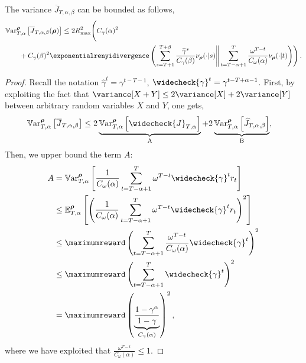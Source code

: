 \begin{lemma}
\label{lem:variance_bound}
The variance $\overline{J}_{T,\alpha,\beta}$ can be bounded as follows,
\begin{align*}
    &\mathbb{V}\mathrm{ar}^{\boldsymbol\rho}_{T,\alpha}\left[\overline{J}_{T,\alpha,\beta}(\boldsymbol\rho)\right]
    \leq
    2 R_{\max}^{2} \Bigg(C_\gamma(\alpha)^2 \\
    &\qquad + C_\gamma(\beta)^2 \exponentialrenyidivergence \left(  \sum_{s=T+1}^{T+\beta} \frac{\widehat{\gamma}^s}{C_\gamma(\beta)} \nu_{\boldsymbol\rho}(\cdot\vert s)  \Bigg\Vert     \sum_{t=T-\alpha+1}^{T} \frac{\omega^{T-t} }{C_\omega(\alpha)}\nu_{\boldsymbol\rho}(\cdot\vert t)  \Bigg) \right).
\end{align*}
\end{lemma}
\begin{proof}
    Recall the notation $\widehat{\gamma}^t=\gamma^{t-T-1}$, $\widecheck{\gamma}^t= \gamma^{t-T+\alpha-1}$. 
    First, by exploiting the fact that $\variance[X+Y] \le 2\variance[X]+2\variance[Y]$ between arbitrary random variables $X$ and $Y$, one gets,
\begin{align}
    \mathbb{V}\mathrm{ar}^{\boldsymbol\rho}_{T,\alpha} \left[\overline{J}_{T,\alpha,\beta}\right] 
    &\leq 2\underbrace{\mathbb{V}\mathrm{ar}^{\boldsymbol\rho}_{T,\alpha} \left[\widecheck{J}_{T,\alpha}\right]}_{\text{A}} + 2\underbrace{\mathbb{V}\mathrm{ar}^{\boldsymbol\rho}_{T,\alpha} \left[\widehat{J}_{T,\alpha,\beta}\right]}_{\text{B}} \nonumber,
\end{align}
Then, we upper bound the term $A$:
\begin{align*}
    A 
    &= \mathbb{V}\mathrm{ar}^{\boldsymbol\rho}_{T,\alpha} \left[ \frac{1}{C_\omega(\alpha)} \sum_{t=T-\alpha+1}^{T} \omega^{T-t} \widecheck{\gamma}^t r_t \right] \\
    & \le \mathbb{E}^{\boldsymbol\rho}_{T,\alpha} \left[ \left(\frac{1}{C_\omega(\alpha)} \sum_{t=T-\alpha+1}^{T} \omega^{T-t} \widecheck{\gamma}^t r_t\right)^2 \right] \\
    & \le \maximumreward  \left(\sum_{t=T-\alpha+1}^{T} \frac{\omega^{T-t}}{C_\omega(\alpha)} \widecheck{\gamma}^t\right)^2 \\
    &\le  \maximumreward  \left(\sum_{t=T-\alpha+1}^{T}  \widecheck{\gamma}^t \right)^2 
    \\
    &= \maximumreward \left( \underbrace{\frac{1-\gamma^\alpha}{1-\gamma}}_{C_\gamma(\alpha)}\right)^2,
\end{align*}
where we have exploited that $\frac{\omega^{T-t}}{C_\omega(\alpha)} \le 1$.

\end{proof}
